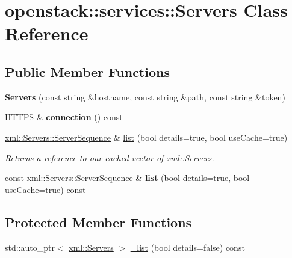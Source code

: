 \hypertarget{classopenstack_1_1services_1_1Servers}{
\section{openstack::services::Servers Class Reference}
\label{classopenstack_1_1services_1_1Servers}
}
\subsection*{Public Member Functions}
\begin{DoxyCompactItemize}
\item 
\hypertarget{classopenstack_1_1services_1_1Servers_a746718bbb56c48644111b4b5422f4aa5}{
{\bfseries Servers} (const string \&hostname, const string \&path, const string \&token)}
\label{classopenstack_1_1services_1_1Servers_a746718bbb56c48644111b4b5422f4aa5}

\item 
\hypertarget{classopenstack_1_1services_1_1Servers_a21bbb298bff85523abcae92e6ceba1a7}{
\hyperlink{classopenstack_1_1services_1_1HTTPS}{HTTPS} \& {\bfseries connection} () const }
\label{classopenstack_1_1services_1_1Servers_a21bbb298bff85523abcae92e6ceba1a7}

\item 
\hyperlink{classopenstack_1_1xml_1_1Servers_a9cc28e68df0ebb654db381f4bc6b43e0}{xml::Servers::ServerSequence} \& \hyperlink{classopenstack_1_1services_1_1Servers_a6e23137e5dbca21835ef80147dd11156}{list} (bool details=true, bool useCache=true)
\begin{DoxyCompactList}\small\item\em Returns a reference to our cached vector of \hyperlink{classopenstack_1_1xml_1_1Servers}{xml::Servers}. \item\end{DoxyCompactList}\item 
\hypertarget{classopenstack_1_1services_1_1Servers_a9bc99eec0e60d113cab9fbe601cfd344}{
const \hyperlink{classopenstack_1_1xml_1_1Servers_a9cc28e68df0ebb654db381f4bc6b43e0}{xml::Servers::ServerSequence} \& {\bfseries list} (bool details=true, bool useCache=true) const }
\label{classopenstack_1_1services_1_1Servers_a9bc99eec0e60d113cab9fbe601cfd344}

\end{DoxyCompactItemize}
\subsection*{Protected Member Functions}
\begin{DoxyCompactItemize}
\item 
std::auto\_\-ptr$<$ \hyperlink{classopenstack_1_1xml_1_1Servers}{xml::Servers} $>$ \hyperlink{classopenstack_1_1services_1_1Servers_a0095242056c238aa451dc2cb52e5fbc7}{\_\-list} (bool details=false) const 
\end{DoxyCompactItemize}

